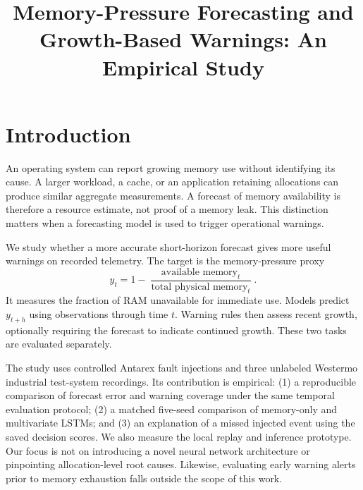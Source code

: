 \documentclass{llncs}
\begin{document}
\title{Memory-Pressure Forecasting and Growth-Based Warnings: An Empirical Study}
\author{}
\institute{}
\maketitle
\thispagestyle{empty}
\begin{abstract}

\end{abstract}

\section{Introduction}
An operating system can report growing memory use without identifying its cause. A larger workload, a cache, or an application retaining allocations can produce similar aggregate measurements. A forecast of memory availability is therefore a resource estimate, not proof of a memory leak. This distinction matters when a forecasting model is used to trigger operational warnings.

We study whether a more accurate short-horizon forecast gives more useful warnings on recorded telemetry. The target is the memory-pressure proxy
\begin{equation}
y_t=1-\frac{\operatorname{available\ memory}_t}{\operatorname{total\ physical\ memory}_t}.
\label{eq:target}
\end{equation}
It measures the fraction of RAM unavailable for immediate use. Models predict $y_{t+h}$ using observations through time $t$. Warning rules then assess recent growth, optionally requiring the forecast to indicate continued growth. These two tasks are evaluated separately.

The study uses controlled Antarex fault injections and three unlabeled Westermo industrial test-system recordings. Its contribution is empirical: (1) a reproducible comparison of forecast error and warning coverage under the same temporal evaluation protocol; (2) a matched five-seed comparison of memory-only and multivariate LSTMs; and (3) an explanation of a missed injected event using the saved decision scores. We also measure the local replay and inference prototype. Our focus is not on introducing a novel neural network architecture or pinpointing allocation-level root causes. Likewise, evaluating early warning alerts prior to memory exhaustion falls outside the scope of this work.
\end{document}
